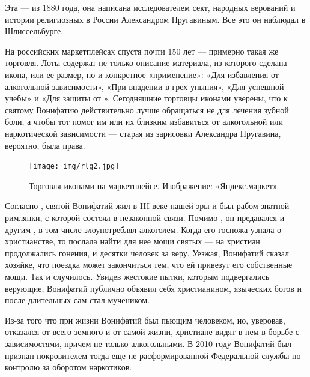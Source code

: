 Эта  --- из 1880 года, она написана исследователем сект, народных верований и истории религиозных  в России Александром Пругавиным. Все это он наблюдал в Шлиссельбурге.

На российских маркетплейсах спустя почти 150 лет --- примерно такая же  торговля. Лоты содержат не только описание материала, из которого сделана икона, или ее размер, но и конкретное «применение»: «Для избавления от алкогольной зависимости», «При впадении в грех уныния», «Для успешной учебы» и «Для защиты от ». Сегодняшние торговцы иконами уверены, что к святому Вонифатию действительно лучше обращаться не для лечения зубной боли, а чтобы тот помог им или их близким избавиться от алкогольной или наркотической зависимости --- старая  из зарисовки Александра Пругавина, вероятно, была права.

\begin{figure}[h]
    \centering
    \texttt{[image: img/rlg2.jpg]}
    \caption{Торговля иконами на маркетплейсе. Изображение: «Яндекс.маркет».}
\end{figure}

Согласно , святой  Вонифатий жил в III веке нашей эры и был рабом знатной римлянки, с которой состоял в незаконной связи. Помимо , он предавался и другим , в том числе злоупотреблял алкоголем. Когда его госпожа узнала о христианстве, то послала найти для нее мощи святых --- на христиан продолжались гонения, и десятки человек  за веру. Уезжая, Вонифатий сказал хозяйке, что поездка может закончиться тем, что ей привезут его собственные мощи. Так и случилось. Увидев жестокие пытки, которым подвергались верующие, Вонифатий публично объявил себя христианином,  языческих богов и после длительных  сам стал мучеником.

Из-за того что при жизни Вонифатий был пьющим человеком, но, уверовав, отказался от всего земного и от самой жизни, христиане видят в нем  в борьбе с зависимостями, причем не только алкогольными. В 2010 году Вонифатий был признан покровителем тогда еще не расформированной Федеральной службы по контролю за оборотом наркотиков.


